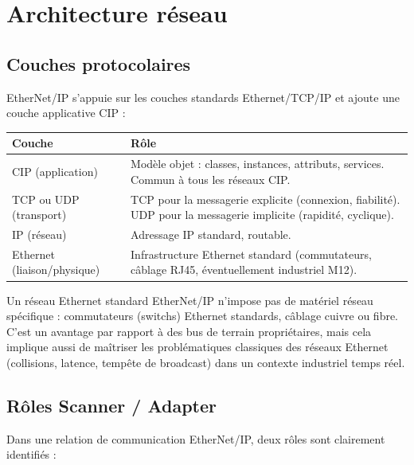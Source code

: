 \section{Architecture réseau}
\label{sec:architecture_reseau}

\subsection{Couches protocolaires}
EtherNet/IP s'appuie sur les couches standards Ethernet/TCP/IP et ajoute une couche applicative CIP :

\begin{center}
    \begin{tabular}{|p{5cm}|p{9cm}|}
        \hline
        \textbf{Couche} & \textbf{Rôle} \\
        \hline
        CIP (application) & Modèle objet : classes, instances, attributs, services. Commun à tous les réseaux CIP. \\
        \hline
        TCP ou UDP (transport) & TCP pour la messagerie explicite (connexion, fiabilité). UDP pour la messagerie implicite (rapidité, cyclique). \\
        \hline
        IP (réseau) & Adressage IP standard, routable. \\
        \hline
        Ethernet (liaison/physique) & Infrastructure Ethernet standard (commutateurs, câblage RJ45, éventuellement industriel M12). \\
        \hline
    \end{tabular}
\end{center}

\begin{UPSTIinfor}{Un réseau Ethernet standard}
    EtherNet/IP n'impose pas de matériel réseau spécifique : commutateurs (switchs) Ethernet standards, câblage cuivre ou fibre. C'est un avantage par rapport à des bus de terrain propriétaires, mais cela implique aussi de maîtriser les problématiques classiques des réseaux Ethernet (collisions, latence, tempête de broadcast) dans un contexte industriel temps réel.
\end{UPSTIinfor}

\subsection{Rôles Scanner / Adapter}
Dans une relation de communication EtherNet/IP, deux rôles sont clairement identifiés :

